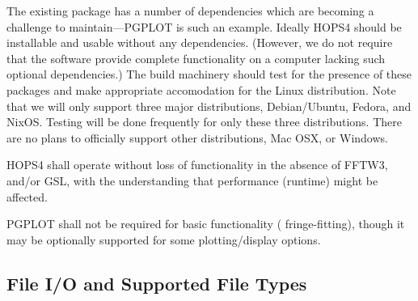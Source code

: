 The existing package has a number of dependencies which are becoming
a challenge to maintain---\acs{PGPLOT} is such an example.  Ideally
HOPS4 should be installable and usable without any dependencies.
(However, we do not require that the software provide complete functionality
on a computer lacking such optional dependencies.) The build machinery should test
for the presence of these packages and make appropriate accomodation for
the Linux distribution. Note that we will only support three major distributions,
Debian/Ubuntu, Fedora, and NixOS. Testing will be done frequently for only these
three distributions. There are no plans to officially support other distributions,
Mac OSX, or Windows.

\begin{description}

 HOPS4 shall operate without loss of functionality in the absence of
FFTW3, and/or GSL, with the understanding that performance (runtime) might be
affected. 

 \acs{PGPLOT} shall not be required for basic functionality (\eg
fringe-fitting),
though it may be optionally supported for some plotting/display options.

\end{description}





\subsection{File I/O and Supported File Types}
\label{sec:ioreq}

